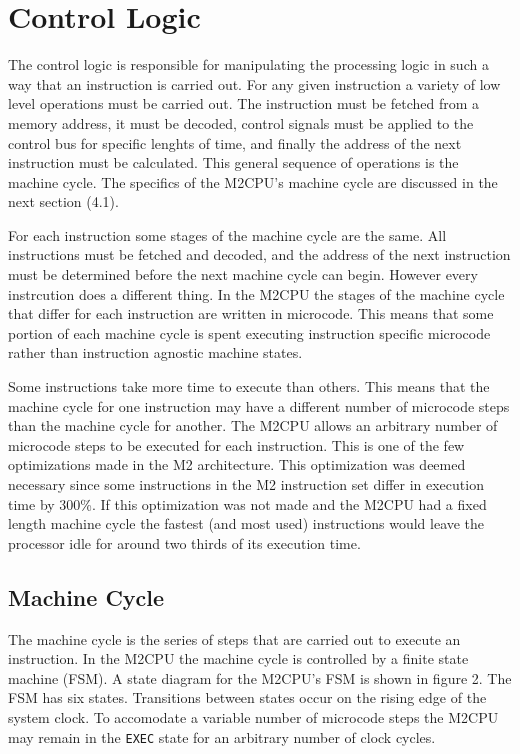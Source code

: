 \documentclass[a4paper,12pt]{article}
\newcommand{\mt}{M2CPU}
\newcommand{\mi}{M2 instruction set}
\newcommand{\ma}{M2 architecture}
\newcommand{\Ex}{\texttt{EXEC}}
\begin{document}
\newpage
\section{Control Logic}
The control logic is responsible for manipulating the processing logic in such
a way that an instruction is carried out. For any given instruction a variety
of low level operations must be carried out. The instruction must be fetched
from a memory address, it must be decoded, control signals must be applied to
the control bus for specific lenghts of time, and finally the address of the
next instruction must be calculated. This general sequence of operations is the
machine cycle. The specifics of the \mt{}'s machine cycle are discussed in the 
next section (4.1).
\par

For each instruction some stages of the machine cycle are the same. All 
instructions must be fetched and decoded, and the address of the next 
instruction must be determined before the next machine cycle can begin. However
every instrcution does a different thing. In the \mt{} the stages of the 
machine cycle that differ for each instruction are written in microcode. This
means that some portion of each machine cycle is spent executing instruction
specific microcode rather than instruction agnostic machine states.
\par

Some instructions take more time to execute than others. This means that the 
machine cycle for one instruction may have a different number of microcode 
steps than the machine cycle for another. The \mt{} allows an arbitrary number
of microcode steps to be executed for each instruction. This is one of the few
optimizations made in the \ma{}. This optimization was deemed necessary since
some instructions in the \mi{} differ in execution time by 300\%. If this
optimization was not made and the \mt{} had a fixed length machine cycle the
fastest (and most used) instructions would leave the processor idle for around
two thirds of its execution time.
\par

\subsection{Machine Cycle}
The machine cycle is the series of steps that are carried out to execute an
instruction. In the \mt{} the machine cycle is controlled by a finite state 
machine (FSM). A state diagram for the \mt{}'s FSM is shown in figure 2. The
FSM has six states. Transitions between states occur on the rising edge of the
system clock. To accomodate a variable number of microcode steps the \mt{} may
remain in the \Ex{} state for an arbitrary number of clock cycles. 
\par
\end{document}
